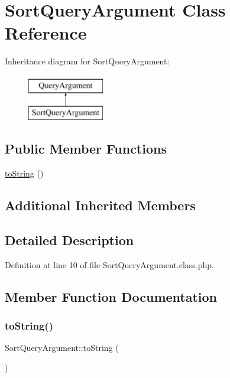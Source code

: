 \hypertarget{classSortQueryArgument}{}\section{Sort\+Query\+Argument Class Reference}
\label{classSortQueryArgument}
Inheritance diagram for Sort\+Query\+Argument\+:\begin{figure}[H]
\begin{center}
\leavevmode
\includegraphics[height=2.000000cm]{classSortQueryArgument}
\end{center}
\end{figure}
\subsection*{Public Member Functions}
\begin{DoxyCompactItemize}
\item 
\hyperlink{classSortQueryArgument_aab3ed55d1387843d144500c68d92c24c}{to\+String} ()
\end{DoxyCompactItemize}
\subsection*{Additional Inherited Members}


\subsection{Detailed Description}


Definition at line 10 of file Sort\+Query\+Argument.\+class.\+php.



\subsection{Member Function Documentation}
\mbox{\label{classSortQueryArgument_aab3ed55d1387843d144500c68d92c24c}} 
\subsubsection{\texorpdfstring{to\+String()}{toString()}}
{\footnotesize\ttfamily Sort\+Query\+Argument\+::to\+String (\begin{DoxyParamCaption}{ }\end{DoxyParamCaption})}

